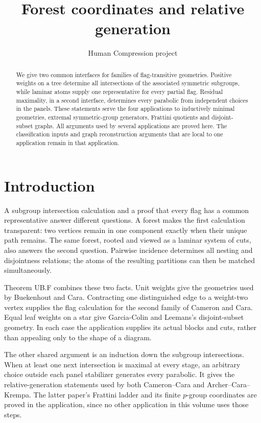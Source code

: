 
\title{Forest coordinates and relative generation}
\author{Human Compression project}
\date{}

\maketitle
\begin{abstract}
We give two common interfaces for families of flag-transitive geometries.
Positive weights on a tree determine all intersections of the associated
symmetric subgroups, while laminar atoms supply one representative for
every partial flag. Residual maximality, in a second interface, determines
every parabolic from independent choices in the panels. These statements
serve the four applications to inductively minimal geometries, extremal
symmetric-group generators, Frattini quotients and disjoint-subset graphs.
All arguments used by several applications are proved here. The
classification inputs and graph reconstruction arguments that are local
to one application remain in that application.
\end{abstract}

\section{Introduction}
A subgroup intersection calculation and a proof that every flag has a
common representative answer different questions. A forest makes the first
calculation transparent: two vertices remain in one component exactly
when their unique path remains. The same forest, rooted and viewed as a
laminar system of cuts, also answers the second question. Pairwise
incidence determines all nesting and disjointness relations; the atoms
of the resulting partitions can then be matched simultaneously.

Theorem UB.F combines these two facts. Unit weights give the geometries
used by Buekenhout and Cara. Contracting one distinguished edge to a
weight-two vertex supplies the flag calculation for the second family
of Cameron and Cara. Equal leaf weights on a star give Garcia-Colin and
Leemans's disjoint-subset geometry. In each case the application supplies
its actual blocks and cuts, rather than appealing only to the shape of
a diagram.

The other shared argument is an induction down the subgroup intersections.
When at least one next intersection is maximal at every stage, an arbitrary
choice outside each panel stabilizer generates every parabolic. It gives
the relative-generation statements used by both Cameron--Cara and
Archer--Cara--Krempa. The latter paper's Frattini ladder and its finite
$p$-group coordinates are proved in the application, since no other
application in this volume uses those steps.

